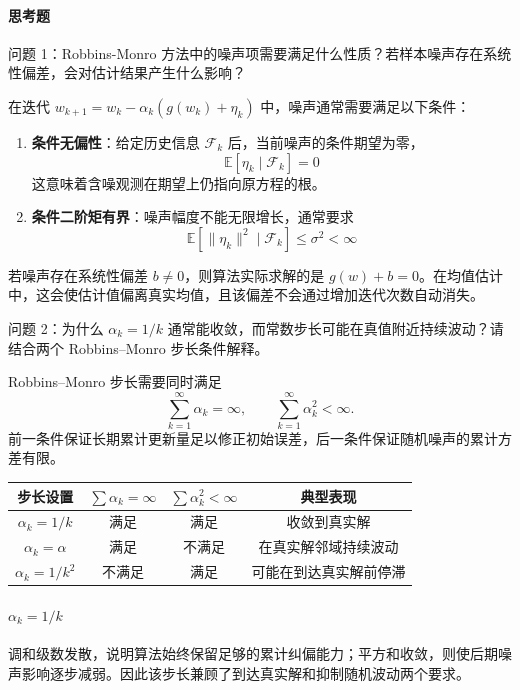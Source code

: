 \documentclass[11pt,a4paper,UTF8]{ctexart}
\numberwithin{figure}{section}
\numberwithin{table}{section}
\newcommand{\answerlabel}{%
  \par\smallskip\noindent{\heiti\bfseries 回答：}\quad}
\begin{document}
\paragraph{思考题}


问题 1：Robbins-Monro 方法中的噪声项需要满足什么性质？若样本噪声存在系统性偏差，会对估计结果产生什么影响？


\answerlabel 
在迭代 $w_{k+1}=w_k-\alpha_k(g(w_k)+\eta_k)$ 中，噪声通常需要满足以下条件：
\begin{enumerate}
\item \textbf{条件无偏性}：给定历史信息 $\mathcal{F}_k$ 后，当前噪声的条件期望为零，
     $$\mathbb{E}[\eta_k \mid \mathcal{F}_k] = 0$$
这意味着含噪观测在期望上仍指向原方程的根。
\item \textbf{条件二阶矩有界}：噪声幅度不能无限增长，通常要求
     $$\mathbb{E}[\|\eta_k\|^2 \mid \mathcal{F}_k] \le \sigma^2 < \infty$$
\end{enumerate}

若噪声存在系统性偏差 $b\neq0$，则算法实际求解的是 $g(w)+b=0$。在均值估计中，这会使估计值偏离真实均值，且该偏差不会通过增加迭代次数自动消失。


问题 2：为什么 $\alpha_k=1/k$ 通常能收敛，而常数步长可能在真值附近持续波动？请结合两个 Robbins--Monro 步长条件解释。


\answerlabel Robbins--Monro 步长需要同时满足
\[
\sum_{k=1}^{\infty}\alpha_k=\infty,\qquad
\sum_{k=1}^{\infty}\alpha_k^2<\infty.
\]
前一条件保证长期累计更新量足以修正初始误差，后一条件保证随机噪声的累计方差有限。

\begin{table}[H]
\centering
\begin{tabular}{cccc}
\toprule
步长设置 & $\sum\alpha_k=\infty$ & $\sum\alpha_k^2<\infty$ & 典型表现 \\
\midrule
$\alpha_k=1/k$ & 满足 & 满足 & 收敛到真实解 \\
$\alpha_k=\alpha$ & 满足 & 不满足 & 在真实解邻域持续波动 \\
$\alpha_k=1/k^2$ & 不满足 & 满足 & 可能在到达真实解前停滞 \\
\bottomrule
\end{tabular}
\end{table}

\paragraph{$\alpha_k=1/k$}
调和级数发散，说明算法始终保留足够的累计纠偏能力；平方和收敛，则使后期噪声影响逐步减弱。因此该步长兼顾了到达真实解和抑制随机波动两个要求。
\end{document}

